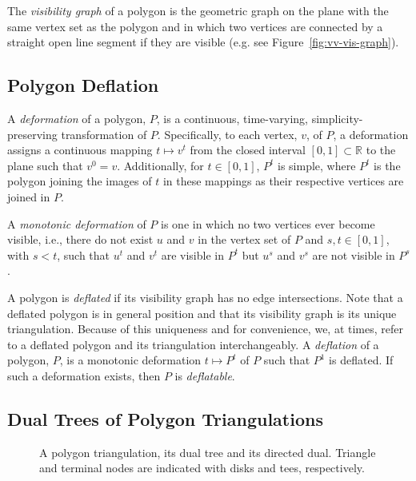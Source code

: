 \documentclass{patmorin}
\newcommand{\R}[0]{\mathds{R}}
\begin{document}
The \emph{visibility graph} of a polygon is the geometric graph on the
plane with the same vertex set as the polygon and in which two
vertices are connected by a straight open line segment if they are
visible (e.g. see Figure~\ref{fig:vv-vis-graph}).


\subsection{Polygon Deflation}

A \emph{deformation} of a polygon, $P$, is a continuous, time-varying,
simplicity-preserving transformation of $P$.  Specifically, to each
vertex, $v$, of $P$, a deformation assigns a continuous mapping
$t\mapsto v^t$ from the closed interval $[0,1]\subset\R$ to the plane
such that $v^0 = v$.  Additionally, for $t\in[0,1]$, $P^t$ is simple,
where $P^t$ is the polygon joining the images of $t$ in these mappings
as their respective vertices are joined in $P$.

A \emph{monotonic deformation} of $P$ is one in which no two vertices
ever become visible, i.e., there do not exist $u$ and $v$ in the
vertex set of $P$ and $s, t\in [0, 1]$, with $s < t$, such that $u^t$
and $v^t$ are visible in $P^t$ but $u^s$ and $v^s$ are not visible in
$P^s$.


A polygon is \emph{deflated} if its visibility graph has no edge
intersections.  Note that a deflated polygon is in general position
and that its visibility graph is its unique triangulation.  Because of
this uniqueness and for convenience, we, at times, refer to a deflated
polygon and its triangulation interchangeably.  A \emph{deflation} of
a polygon, $P$, is a monotonic deformation $t\mapsto P^t$ of $P$ such
that $P^1$ is deflated.  If such a deformation exists, then $P$ is
\emph{deflatable}.


\subsection{Dual Trees of Polygon Triangulations}

\begin{figure}[htb]
  \centering
  \quad
  \quad
  \caption{\protect{} A polygon
    triangulation, \protect{} its dual tree
    and \protect{} its directed dual.  Triangle
    and terminal nodes are indicated with disks and tees,
    respectively.}
  \label{fig:pt-dt-dd}
\end{figure}
\end{document}
